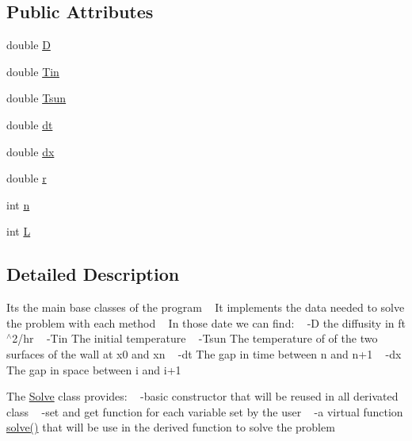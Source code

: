 \subsection*{Public Attributes}
\begin{DoxyCompactItemize}
\item 
double \hyperlink{class_solve_ab6b73352e9bca73bad1b133fc84f008c}{D}
\item 
double \hyperlink{class_solve_a324c747af91a26a206d7772853b8655e}{Tin}
\item 
double \hyperlink{class_solve_a7145536b49fb1ac4d2f36f800d118616}{Tsun}
\item 
double \hyperlink{class_solve_ac1befb9c006f895fb0517e19c412ca57}{dt}
\item 
double \hyperlink{class_solve_a21b9b8118f508e079f066d2ce2816dd1}{dx}
\item 
double \hyperlink{class_solve_a8007aa7266c3ba3207ce233d54d720d7}{r}
\item 
int \hyperlink{class_solve_acc2a34441a699bf1e68f730a1bbe7774}{n}
\item 
int \hyperlink{class_solve_a95de020d455d886e667b8307d7efed55}{L}
\end{DoxyCompactItemize}


\subsection{Detailed Description}
It\textquotesingle{}s the main base classes of the program ~\newline
 It implements the data needed to solve the problem with each method ~\newline
 In those date we can find\+: ~\newline
-\/D the diffusity in ft$^\wedge$2/hr ~\newline
-\/\+Tin The initial temperature ~\newline
-\/\+Tsun The temperature of of the two surfaces of the wall at x0 and xn ~\newline
-\/dt The gap in time between n and n+1 ~\newline
-\/dx The gap in space between i and i+1

The \hyperlink{class_solve}{Solve} class provides\+: ~\newline
-\/basic constructor that will be reused in all derivated class ~\newline
-\/set and get function for each variable set by the user ~\newline
-\/a virtual function \hyperlink{class_solve_a1a56722993fdabea9928637d7dd8a2c7}{solve()} that will be use in the derived function to solve the problem 

